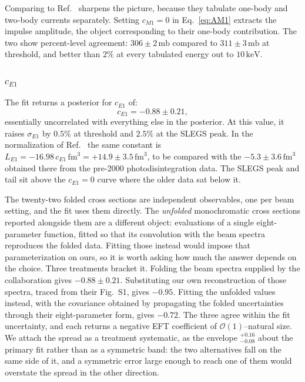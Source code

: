 \documentclass[
  aps,prd,twocolumn,nofootinbib,superscriptaddress,
  longbibliography,floatfix,preprintnumbers
]{revtex4-2}
\newcommand{\Mone}{M1}
\newcommand{\Eone}{E1}
\begin{document}
Comparing to Ref.~\cite{Du:2022zds} sharpens the picture, because they tabulate one-body and
two-body currents separately. Setting $c_{\Mone}=0$ in Eq.~\eqref{eq:AM1} extracts
the impulse amplitude, the object corresponding to their one-body contribution.  The two
show percent-level agreement: $306\pm2\,\mathrm{mb}$ compared to $311\pm3\,\mathrm{mb}$ at threshold,
and better than $2\%$ at every tabulated energy out to $10\,\mathrm{keV}$. 

\subsubsection{$c_{\Eone}$}

The fit returns a posterior for $c_{\Eone}$ of:
\begin{equation}
  c_{\Eone} = -0.88\pm0.21,
  \label{eq:cE1fit}
\end{equation}
essentially uncorrelated with everything else in the posterior. At this value, it raises $\sigma_{\Eone}$ by
$0.5\%$ at threshold and $2.5\%$ at the SLEGS peak. In the normalization of
Ref.~\cite{Rupak:1999rk} the same constant is
$L_{\Eone}=-16.98\,c_{\Eone}\,\mathrm{fm}^{3}=+14.9\pm3.5\,\mathrm{fm}^{3}$,
to be compared with the $-5.3\pm3.6\,\mathrm{fm}^{3}$ obtained there from the pre-2000
photodisintegration data. The SLEGS peak and tail sit above the $c_{\Eone}=0$ curve
where the older data sat below it.

The twenty-two folded cross sections are independent observables, one per beam setting,
and the fit uses them directly. The \emph{unfolded} monochromatic cross sections reported
alongside them are a different object: evaluations of a single eight-parameter function,
fitted so that its convolution with the beam spectra reproduces the folded data. Fitting
those instead would impose that parameterization on ours, so it is worth asking how much
the answer depends on the choice. Three treatments bracket it. Folding the beam spectra
supplied by the collaboration gives $-0.88\pm0.21$. Substituting our own reconstruction of
those spectra, traced from their Fig.~S1, gives $-0.95$. Fitting the unfolded values
instead, with the covariance obtained by propagating the folded uncertainties through
their eight-parameter form, gives $-0.72$. The three agree within the fit uncertainty, and
each returns a negative EFT coefficient of $\mathcal{O}(1)$--natural size. We attach the
spread as a treatment systematic, as the envelope
${}^{+0.16}_{-0.08}$ about the primary fit rather than as a symmetric band: the two
alternatives fall on the same side of it, and a symmetric error large enough to reach
one of them would overstate the spread in the other direction.
\end{document}
